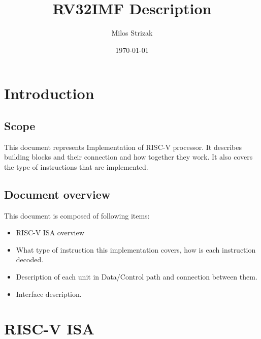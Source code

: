 \documentclass{scrreprt}
\title{RV32IMF Description}
\author{Milos Strizak}
\date{\today}
\begin{document}
\maketitle
\thispagestyle{empty}
\tableofcontents
\listoffigures
\listoftables


\newpage

\section*{Introduction}
\subsection*{Scope}
This document represents Implementation of RISC-V processor. It describes building blocks and their 
connection and how together they work. It also covers the type of instructions that are implemented.
\subsection*{Document overview}
This document is composed of following items:
\begin{itemize}
    \item RISC-V ISA overview
    \item What type of instruction this implementation covers, how is each instruction decoded.
    \item Description of each unit in Data/Control path and connection between them.
    \item Interface description. 
\end{itemize}

\newpage
\section*{RISC-V ISA}
\end{document}
